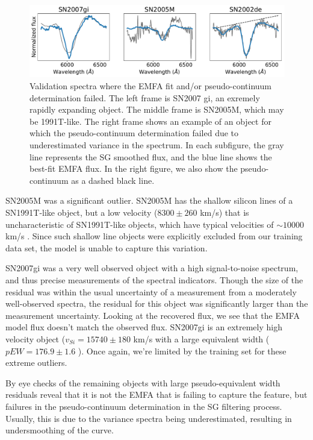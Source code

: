 \begin{figure}[!htb]
    \centering
    \includegraphics[width=\textwidth]{figures/si_feat_pca/fit_failures.pdf}
    \caption{Validation spectra where the EMFA fit and/or pseudo-continuum determination failed. The left frame is SN2007 gi, an exremely rapidly expanding object. The middle frame is SN2005M, which may be 1991T-like. The right frame shows an example of an object for which the pseudo-continuum determination failed due to underestimated variance in the spectrum. In each subfigure, the gray line represents the SG smoothed flux, and the blue line shows the best-fit EMFA flux. In the right figure, we also show the pseudo-continuum as a dashed black line.}
    \label{valid_failures}
\end{figure}

SN2005M was a significant outlier. SN2005M has the shallow silicon lines of a SN1991T-like object, but a low velocity ($8300\pm 260$ km/s) that is uncharacteristic of SN1991T-like objects, which have typical velocities of $\sim 10000$ km/s \citep{blondin_sn2005m_2012}. Since such shallow line objects were explicitly excluded from our training data set, the model is unable to capture this variation.

SN2007gi was a very well observed object with a high signal-to-noise spectrum, and thus precise measurements of the spectral indicators. Though the size of the residual was within the usual uncertainty of a measurement from a moderately well-observed spectra, the residual for this object was significantly larger than the measurement uncertainty. Looking at the recovered flux, we see that the EMFA model flux doesn't match the observed flux. SN2007gi is an extremely high velocity object ($v_{Si}=15740\pm180$ km/s with a large equivalent width ($pEW=176.9\pm1.6$ \angstrom). Once again, we're limited by the training set for these extreme outliers.

By eye checks of the remaining objects with large pseudo-equivalent width residuals reveal that it is not the EMFA that is failing to capture the feature, but failures in the pseudo-continuum determination in the SG filtering process. Usually, this is due to the variance spectra being underestimated, resulting in undersmoothing of the curve.

